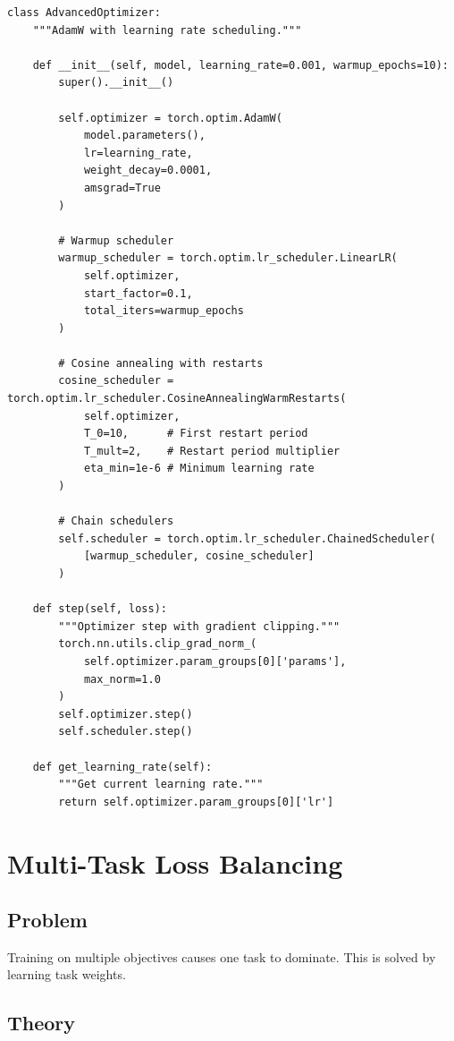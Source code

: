 \documentclass[12pt,a4paper,oneside]{report}
\begin{document}
\begin{lstlisting}
class AdvancedOptimizer:
    """AdamW with learning rate scheduling."""

    def __init__(self, model, learning_rate=0.001, warmup_epochs=10):
        super().__init__()

        self.optimizer = torch.optim.AdamW(
            model.parameters(),
            lr=learning_rate,
            weight_decay=0.0001,
            amsgrad=True
        )

        # Warmup scheduler
        warmup_scheduler = torch.optim.lr_scheduler.LinearLR(
            self.optimizer,
            start_factor=0.1,
            total_iters=warmup_epochs
        )

        # Cosine annealing with restarts
        cosine_scheduler = torch.optim.lr_scheduler.CosineAnnealingWarmRestarts(
            self.optimizer,
            T_0=10,      # First restart period
            T_mult=2,    # Restart period multiplier
            eta_min=1e-6 # Minimum learning rate
        )

        # Chain schedulers
        self.scheduler = torch.optim.lr_scheduler.ChainedScheduler(
            [warmup_scheduler, cosine_scheduler]
        )

    def step(self, loss):
        """Optimizer step with gradient clipping."""
        torch.nn.utils.clip_grad_norm_(
            self.optimizer.param_groups[0]['params'],
            max_norm=1.0
        )
        self.optimizer.step()
        self.scheduler.step()

    def get_learning_rate(self):
        """Get current learning rate."""
        return self.optimizer.param_groups[0]['lr']
\end{lstlisting}

\section{Multi-Task Loss Balancing}

\subsection{Problem}

Training on multiple objectives causes one task to dominate. This is solved by learning task weights.

\subsection{Theory}
\end{document}
